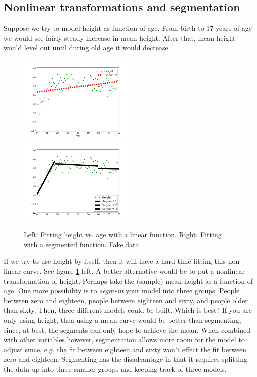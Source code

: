 \subsection{Nonlinear transformations and segmentation}
Suppose we try to model height as function of age.  From birth to 17 years of age we would see fairly steady increase in mean height.  After that, mean height would level out until during old age it would decrease.  
\begin{figure}
  \label{linear:fig:mean-height}
  \includegraphics[width=0.5\textwidth]{../images/height_v_age_linearfit}
  \includegraphics[width=0.5\textwidth]{../images/height_v_age_segmentfit}
  \caption{Left:  Fitting height vs. age with a linear function.  Right:  Fitting with a segmented function.  Fake data.}
\end{figure}
If we try to use height by itself, then it will have a hard time fitting this non-linear curve.  See figure \ref{linear:fig:mean-height} left.  A better alternative would be to put a nonlinear transformation of height.  Perhaps take the (sample) mean height as a function of age.  One more possibility is to \emph{segment} your model into three groups:  People between zero and eighteen, people between eighteen and sixty, and people older than sixty.  Then, three different models could be built.  Which is best?  If you are only using height, then using a mean curve would be better than segmenting, since, at best, the segments can only hope to achieve the mean.  When combined with other variables however, segmentation allows more room for the model to adjust since, e.g. the fit between eighteen and sixty won't effect the fit between zero and eighteen.  Segmenting has the disadvantage in that it requires splitting the data up into three smaller groups and keeping track of three models.

